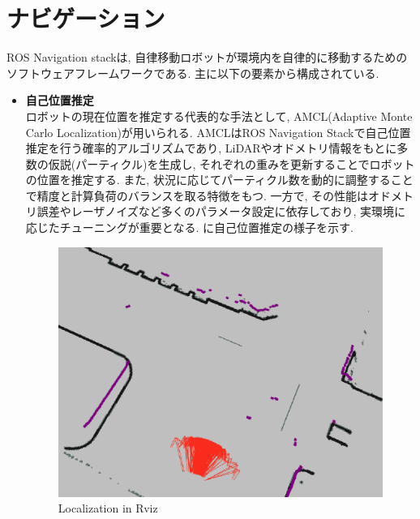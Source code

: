 \section{ナビゲーション}
ROS Navigation stack\cite{navstack}は, 自律移動ロボットが環境内を自律的に移動するためのソフトウェアフレームワークである. 主に以下の要素から構成されている. 
\begin{itemize}
     \item \textbf{自己位置推定}\\
     ロボットの現在位置を推定する代表的な手法として, AMCL(Adaptive Monte Carlo Localization)が用いられる. 
     AMCLはROS Navigation Stackで自己位置推定を行う確率的アルゴリズムであり, LiDARやオドメトリ情報をもとに多数の仮説(パーティクル)を生成し, 
     それぞれの重みを更新することでロボットの位置を推定する. また, 状況に応じてパーティクル数を動的に調整することで精度と計算負荷のバランスを取る特徴をもつ. 
     一方で, その性能はオドメトリ誤差やレーザノイズなど多くのパラメータ設定に依存しており, 実環境に応じたチューニングが重要となる. 
     に自己位置推定の様子を示す. 
     \begin{figure}[hbtp]
     \centering
          \includegraphics[keepaspectratio, scale=0.2]
           {images/amcl_example.png}
          \caption{Localization in Rviz}
          \label{Fig:lamcl_example}
     \end{figure}


\end{itemize}
